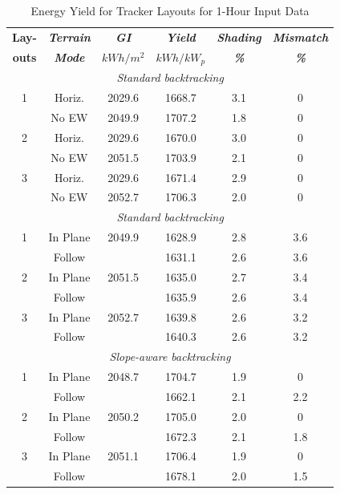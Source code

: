 \documentclass[conference]{IEEEtran}
\begin{document}
\begin{table}[htbp]
\caption{Energy Yield for Tracker Layouts for 1-Hour Input Data}
\begin{center}
\begin{tabular}{|c|c|c|c|c|c|}
\hline
\textbf{Lay-}& \textbf{\textit{Terrain}}& \textbf{\textit{GI}}&        \textbf{\textit{Yield}}&        \textbf{\textit{Shading}}& \textbf{\textit{Mismatch}} \\
\textbf{outs}& \textbf{\textit{Mode}}&    \textbf{\textit{$kWh/m^2$}}& \textbf{\textit{$kWh / kW_p$}}& \textbf{\textit{\%}}&      \textbf{\textit{\%}} \\
\hline
\multicolumn{6}{|c|}{\textit{Standard backtracking}} \\
\hline
1& Horiz.& 2029.6&  1668.7& 3.1& 0 \\
 & No EW & 2049.9&  1707.2& 1.8& 0 \\
\hline
2& Horiz.& 2029.6&  1670.0& 3.0& 0 \\
 & No EW & 2051.5&  1703.9& 2.1& 0 \\
\hline
3& Horiz.& 2029.6&  1671.4& 2.9& 0 \\
 & No EW & 2052.7&  1706.3& 2.0& 0 \\
\hline
\multicolumn{6}{|c|}{\textit{Standard backtracking}} \\
\hline
1& In Plane& 2049.9&  1628.9& 2.8& 3.6 \\
 & Follow&         &  1631.1& 2.6& 3.6 \\
\hline
2& In Plane& 2051.5&  1635.0& 2.7& 3.4 \\
 & Follow&         &  1635.9& 2.6& 3.4 \\
\hline
3& In Plane& 2052.7&  1639.8& 2.6& 3.2 \\
 & Follow&         &  1640.3& 2.6& 3.2 \\
\hline
\multicolumn{6}{|c|}{\textit{Slope-aware backtracking}} \\
\hline
1& In Plane& 2048.7&  1704.7& 1.9& 0 \\
 & Follow&         &  1662.1& 2.1& 2.2 \\
\hline
2& In Plane& 2050.2&  1705.0& 2.0& 0 \\
 & Follow&         &  1672.3& 2.1& 1.8 \\
\hline
3& In Plane& 2051.1&  1706.4& 1.9& 0 \\
 & Follow&         &  1678.1& 2.0& 1.5 \\
\hline
\end{tabular}
\label{table:energy-1hr}
\end{center}
\end{table}
\end{document}
